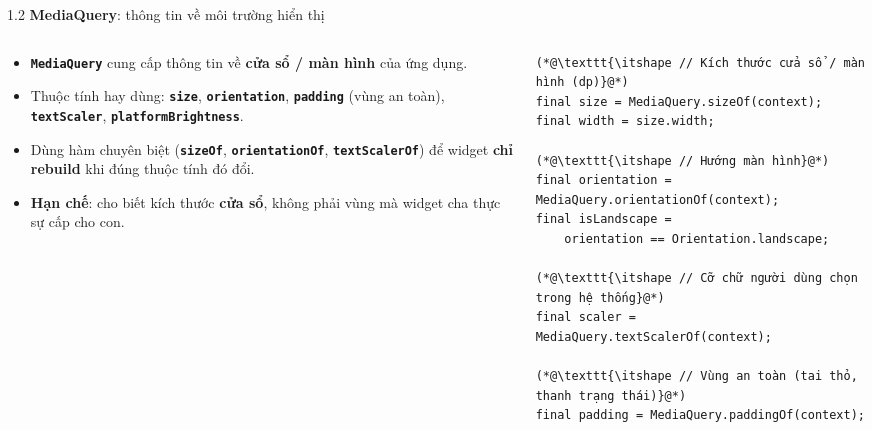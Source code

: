 \documentclass[aspectratio=169,10pt]{beamer}
\newcommand{\api}[1]{\texttt{\bfseries #1}}   %
\begin{document}
\begin{frame}[fragile]{1.2 \textbf{MediaQuery}: thông tin về môi trường hiển thị}
  \begin{columns}[T]
    \begin{column}{0.44\textwidth}
      \small
      \begin{itemize}\itemsep4pt
        \item \api{MediaQuery} cung cấp thông tin về \textbf{cửa sổ / màn hình} của ứng dụng.
        \item Thuộc tính hay dùng: \api{size}, \api{orientation}, \api{padding} (vùng an toàn), \api{textScaler}, \api{platformBrightness}.
        \item Dùng hàm chuyên biệt (\api{sizeOf}, \api{orientationOf}, \api{textScalerOf}) để widget \textbf{chỉ rebuild} khi đúng thuộc tính đó đổi.
        \item \textbf{Hạn chế}: cho biết kích thước \textbf{cửa sổ}, không phải vùng mà widget cha thực sự cấp cho con.
      \end{itemize}
    \end{column}
    \begin{column}{0.54\textwidth}
\begin{lstlisting}[basicstyle=\ttfamily\fontsize{6.8}{8}\selectfont]
(*@\texttt{\itshape // Kích thước cửa sổ / màn hình (dp)}@*)
final size = MediaQuery.sizeOf(context);
final width = size.width;

(*@\texttt{\itshape // Hướng màn hình}@*)
final orientation = MediaQuery.orientationOf(context);
final isLandscape =
    orientation == Orientation.landscape;

(*@\texttt{\itshape // Cỡ chữ người dùng chọn trong hệ thống}@*)
final scaler = MediaQuery.textScalerOf(context);

(*@\texttt{\itshape // Vùng an toàn (tai thỏ, thanh trạng thái)}@*)
final padding = MediaQuery.paddingOf(context);
\end{lstlisting}
    \end{column}
  \end{columns}
\end{frame}
\end{document}
